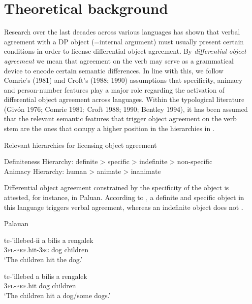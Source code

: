 \documentclass[output=paper]{langsci/langscibook}
\begin{document}
\section{Theoretical background}

Research over the last decades across various languages has shown that verbal agreement with a DP object (=internal argument) must usually present certain conditions in order to license differential object agreement. By \textit{differential object agreement} we mean that agreement on the verb may serve as a grammatical device to encode certain semantic differences. In line with this, we follow Comrie’s (1981) and Croft’s (1988; 1990) assumptions that specificity, animacy and person-number features play a major role regarding the activation of differential object agreement across languages. Within the typological literature (Givón 1976; Comrie 1981; Croft 1988; 1990; Bentley 1994), it has been assumed that the relevant semantic features that trigger object agreement on the verb stem are the ones that occupy a higher position in the hierarchies in .

{Relevant hierarchies for licensing object agreement}

\ea
\ea
  \textup{Definiteness Hierarchy: definite {\textgreater} specific {\textgreater} indefinite {\textgreater} non-specific}\\
\ex 
\textup{Animacy Hierarchy: human {\textgreater} animate {\textgreater} inanimate}\\
\z
\z

Differential object agreement constrained by the specificity of the object is attested, for instance, in Paluan. According to \citet[218]{Woolford2000}, a definite and specific object in this language triggers verbal agreement, whereas an indefinite object does not .

{Palauan {\citep[30]{Georgopoulos1991}}}

\ea
\gll te-’illebed-ii             a bilis          a rengalek\\
     \textsc{3pl-prf}.hit-\textsc{3sg}        dog              children\\
\glt ‘The children hit the dog.’
\z

\ea
\gll te-’illebed           a bílis         a rengalek\\
     \textsc{3}{\textsc{pl}}\textsc{{}-}{\textsc{prf}}.hit         dog             children\\
\glt ‘The children hit a dog/some dogs.’
\z
\end{document}
